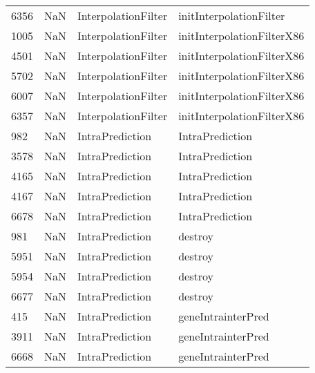 \begin{tabular}{llll}
6356 &                   NaN &        InterpolationFilter &                   initInterpolationFilter \\
1005 &                   NaN &        InterpolationFilter &                initInterpolationFilterX86 \\
4501 &                   NaN &        InterpolationFilter &                initInterpolationFilterX86 \\
5702 &                   NaN &        InterpolationFilter &                initInterpolationFilterX86 \\
6007 &                   NaN &        InterpolationFilter &                initInterpolationFilterX86 \\
6357 &                   NaN &        InterpolationFilter &                initInterpolationFilterX86 \\
982  &                   NaN &            IntraPrediction &                           IntraPrediction \\
3578 &                   NaN &            IntraPrediction &                           IntraPrediction \\
4165 &                   NaN &            IntraPrediction &                           IntraPrediction \\
4167 &                   NaN &            IntraPrediction &                           IntraPrediction \\
6678 &                   NaN &            IntraPrediction &                           IntraPrediction \\
981  &                   NaN &            IntraPrediction &                                   destroy \\
5951 &                   NaN &            IntraPrediction &                                   destroy \\
5954 &                   NaN &            IntraPrediction &                                   destroy \\
6677 &                   NaN &            IntraPrediction &                                   destroy \\
415  &                   NaN &            IntraPrediction &                        geneIntrainterPred \\
3911 &                   NaN &            IntraPrediction &                        geneIntrainterPred \\
6668 &                   NaN &            IntraPrediction &                        geneIntrainterPred \\

\end{tabular}
